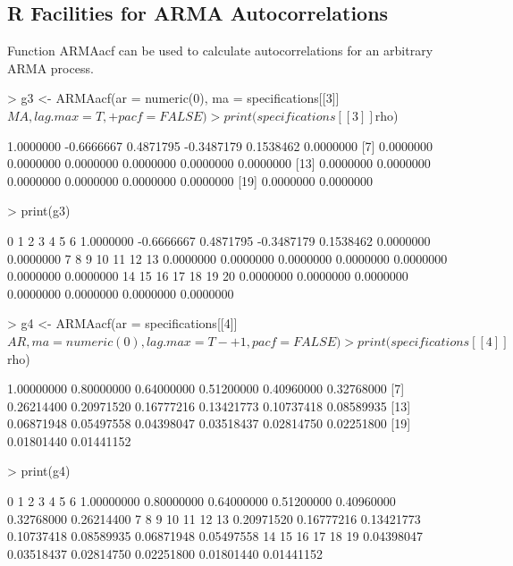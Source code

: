 \subsection{R Facilities for ARMA Autocorrelations}
Function ARMAacf can be used to calculate autocorrelations for an arbitrary ARMA process.
\begin{Schunk}
\begin{Sinput}
> g3 <- ARMAacf(ar = numeric(0), ma = specifications[[3]]$MA, lag.max = T, 
+     pacf = FALSE)
> print(specifications[[3]]$rho)
\end{Sinput}
\begin{Soutput}
 [1]  1.0000000 -0.6666667  0.4871795 -0.3487179  0.1538462  0.0000000
 [7]  0.0000000  0.0000000  0.0000000  0.0000000  0.0000000  0.0000000
[13]  0.0000000  0.0000000  0.0000000  0.0000000  0.0000000  0.0000000
[19]  0.0000000  0.0000000
\end{Soutput}
\begin{Sinput}
> print(g3)
\end{Sinput}
\begin{Soutput}
         0          1          2          3          4          5          6 
 1.0000000 -0.6666667  0.4871795 -0.3487179  0.1538462  0.0000000  0.0000000 
         7          8          9         10         11         12         13 
 0.0000000  0.0000000  0.0000000  0.0000000  0.0000000  0.0000000  0.0000000 
        14         15         16         17         18         19         20 
 0.0000000  0.0000000  0.0000000  0.0000000  0.0000000  0.0000000  0.0000000 
\end{Soutput}
\begin{Sinput}
> g4 <- ARMAacf(ar = specifications[[4]]$AR, ma = numeric(0), lag.max = T - 
+     1, pacf = FALSE)
> print(specifications[[4]]$rho)
\end{Sinput}
\begin{Soutput}
 [1] 1.00000000 0.80000000 0.64000000 0.51200000 0.40960000 0.32768000
 [7] 0.26214400 0.20971520 0.16777216 0.13421773 0.10737418 0.08589935
[13] 0.06871948 0.05497558 0.04398047 0.03518437 0.02814750 0.02251800
[19] 0.01801440 0.01441152
\end{Soutput}
\begin{Sinput}
> print(g4)
\end{Sinput}
\begin{Soutput}
         0          1          2          3          4          5          6 
1.00000000 0.80000000 0.64000000 0.51200000 0.40960000 0.32768000 0.26214400 
         7          8          9         10         11         12         13 
0.20971520 0.16777216 0.13421773 0.10737418 0.08589935 0.06871948 0.05497558 
        14         15         16         17         18         19 
0.04398047 0.03518437 0.02814750 0.02251800 0.01801440 0.01441152 
\end{Soutput}
\end{Schunk}
